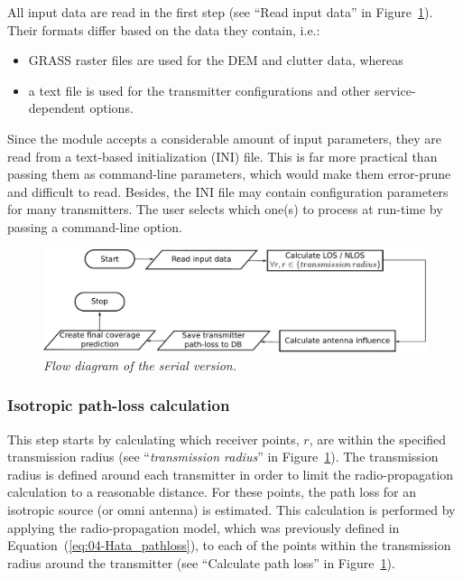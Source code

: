 All input data are read in the first step (see ``Read input data''
in Figure~\ref{fig:04-Flow_diagram_serial_version}). Their formats
differ based on the data they contain, i.e.:
\begin{itemize}
\item GRASS raster files are used for the DEM and clutter data, whereas
\item a text file is used for the transmitter configurations and other service-dependent
options.
\end{itemize}
Since the module accepts a considerable amount of input parameters,
they are read from a text-based initialization (INI)
file. This is far more practical than passing them as command-line
parameters, which would make them error-prune and difficult to read.
Besides, the INI file may contain configuration parameters for many
transmitters. The user selects which one(s) to process at run-time
by passing a command-line option.

\begin{figure}
\centering

\includegraphics[width=1\columnwidth]{04-framework_design_and_implementation/img/serial_implementation_flow_diagram}

\caption{\textit{\emph{Flow diagram of the serial version.}}\textit{\label{fig:04-Flow_diagram_serial_version}}}
\end{figure}



\subsubsection{Isotropic path-loss calculation\label{sub:04-Isotrophic_pahloss_calculation}}

This step starts by calculating which receiver points, $r$, are within
the specified transmission radius (see ``\emph{transmission radius}''
in Figure~\ref{fig:04-Flow_diagram_serial_version}). The transmission
radius is defined around each transmitter in order to limit the radio-propagation
calculation to a reasonable distance. For these points, the path loss
for an isotropic source (or omni antenna) is estimated. This calculation
is performed by applying the radio-propagation model, which was previously
defined in Equation~(\ref{eq:04-Hata_pathloss}), to each of the
points within the transmission radius around the transmitter (see
``Calculate path loss'' in Figure~\ref{fig:04-Flow_diagram_serial_version}).

